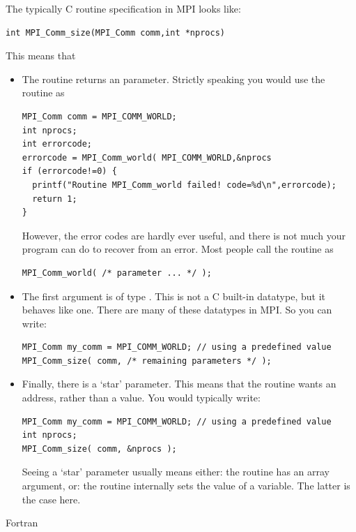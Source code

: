 The typically C routine specification in MPI looks like:
\begin{verbatim}
int MPI_Comm_size(MPI_Comm comm,int *nprocs)
\end{verbatim}
This means that
\begin{itemize}
\item The routine returns an  parameter. Strictly speaking you
  would use the routine as
\begin{verbatim}
MPI_Comm comm = MPI_COMM_WORLD;
int nprocs;
int errorcode;
errorcode = MPI_Comm_world( MPI_COMM_WORLD,&nprocs
if (errorcode!=0) {
  printf("Routine MPI_Comm_world failed! code=%d\n",errorcode);
  return 1;
}
\end{verbatim}
  However, the error codes are hardly ever useful, and there is not
  much your program can do to recover from an error. Most people call
  the routine as
\begin{verbatim}
MPI_Comm_world( /* parameter ... */ );
\end{verbatim}
\item The first argument is of type . This is not a C
  built-in datatype, but it behaves like one. There are many of these
   datatypes in MPI. So you can write:
\begin{verbatim}
MPI_Comm my_comm = MPI_COMM_WORLD; // using a predefined value
MPI_Comm_size( comm, /* remaining parameters */ );
\end{verbatim}
\item Finally, there is a `star' parameter. This means that the
  routine wants an address, rather than a value. You would typically write:
\begin{verbatim}
MPI_Comm my_comm = MPI_COMM_WORLD; // using a predefined value
int nprocs;
MPI_Comm_size( comm, &nprocs );
\end{verbatim}
  Seeing a `star' parameter usually means either: the routine has an
  array argument, or: the routine internally sets the value of a
  variable. The latter is the case here.
\end{itemize}

 {Fortran}

